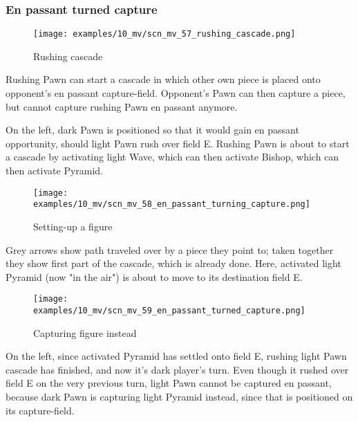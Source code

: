 \subsubsection*{En passant turned capture}
\label{sec:Miranda's veil/Wave/Cascading Waves/En passant turned capture}

\vspace*{-0.7\baselineskip}
\noindent
\begin{wrapfigure}[15]{l}{0.4\textwidth}
\centering
\texttt{[image: examples/10\_mv/scn\_mv\_57\_rushing\_cascade.png]}
\vspace*{-1.4\baselineskip}
\caption{Rushing cascade}
\label{fig:scn_mv_57_rushing_cascade}
\end{wrapfigure}
Rushing Pawn can start a cascade in which other own piece is placed onto opponent's
en passant capture-field.
Opponent's Pawn can then capture a piece, but cannot capture rushing Pawn en passant
anymore.

On the left, dark Pawn is positioned so that it would gain en passant opportunity,
should light Pawn rush over field E. Rushing Pawn is about to start a cascade by
activating light Wave, which can then activate Bishop, which can then activate
Pyramid.


\noindent
\begin{wrapfigure}[7]{l}{0.4\textwidth}
\centering
\texttt{[image: examples/10\_mv/scn\_mv\_58\_en\_passant\_turning\_capture.png]}
\vspace*{-1.4\baselineskip}
\caption{Setting-up a figure}
\label{fig:scn_mv_58_en_passant_turning_capture}
\end{wrapfigure}
Grey arrows show path traveled over by a piece they point to; taken together they
show first part of the cascade, which is already done. \newline
\indent
Here, activated light Pyramid (now "in the air") is about to move to its destination
field E.

\clearpage %

\vspace*{-2.1\baselineskip}
\noindent
\begin{wrapfigure}[11]{l}{0.4\textwidth}
\centering
\texttt{[image: examples/10\_mv/scn\_mv\_59\_en\_passant\_turned\_capture.png]}
\vspace*{-1.4\baselineskip}
\caption{Capturing figure instead}
\label{fig:scn_mv_59_en_passant_turned_capture}
\end{wrapfigure}
On the left, since activated Pyramid has settled onto field E, rushing light Pawn
cascade has finished, and now it's dark player's turn. \newline
\indent
Even though it rushed over field E on the very previous turn, light Pawn cannot
be captured en passant, because dark Pawn is capturing light Pyramid instead,
since that is positioned on its capture-field.

